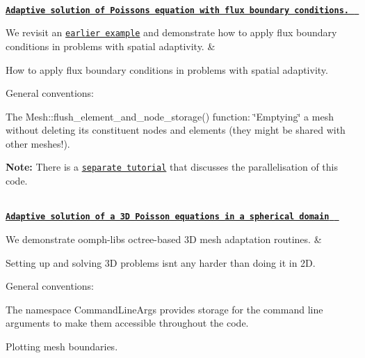 \begin{longtabu}
\\
\href{../../poisson/two_d_poisson_flux_bc_adapt/html/index.html}{\tt {\bfseries  Adaptive solution of Poisson\textquotesingle{}s equation with flux boundary conditions. } }

We revisit an \href{../../poisson/two_d_poisson_flux_bc2/html/index.html}{\tt earlier example} and demonstrate how to apply flux boundary conditions in problems with spatial adaptivity.  &
\begin{DoxyItemize}
\item How to apply flux boundary conditions in problems with spatial adaptivity.
\item General conventions\+:
\begin{DoxyItemize}
\item The {\ttfamily Mesh\+::flush\+\_\+element\+\_\+and\+\_\+node\+\_\+storage()} function\+: \char`\"{}\+Emptying\char`\"{} a mesh without deleting its constituent nodes and elements (they might be shared with other meshes!).
\end{DoxyItemize}
\item {\bfseries Note\+:} There is a \href{../../mpi/two_d_poisson_flux_bc_adapt/html/index.html}{\tt separate tutorial} that discusses the parallelisation of this code.
\end{DoxyItemize}

\\
\href{../../poisson/eighth_sphere_poisson/html/index.html}{\tt {\bfseries  Adaptive solution of a 3D Poisson equations in a spherical domain } }

We demonstrate {\ttfamily oomph-\/lib\textquotesingle{}s} octree-\/based 3D mesh adaptation routines.  &
\begin{DoxyItemize}
\item Setting up and solving 3D problems isn\textquotesingle{}t any harder than doing it in 2D.
\item General conventions\+:
\begin{DoxyItemize}
\item The namespace {\ttfamily Command\+Line\+Args} provides storage for the command line arguments to make them accessible throughout the code.
\item Plotting mesh boundaries. 
\end{DoxyItemize}
\end{DoxyItemize}



\\
\end{longtabu}
